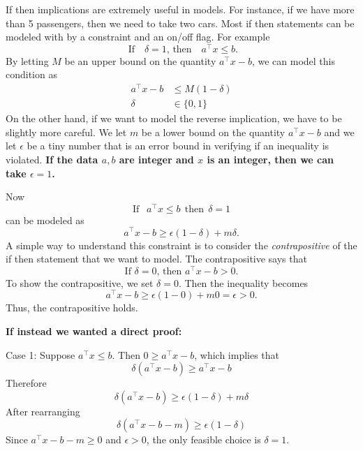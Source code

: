 \documentclass[../open-optimization/open-optimization.tex]{subfiles}
\begin{document}
If then implications are extremely useful in models.  
For instance, if we have more than 5 passengers, then we need to take two cars.   Most if then statements can be modeled with by a constraint and an on/off flag.  For example
\begin{equation}
\text{ If } \ \ \   \delta = 1 \text{, then  } \ \ \ a^\top x \leq b.
\end{equation}
By letting $M$ be an upper bound on the quantity $a^\top x - b$, we can model this condition as 
\begin{equation}
\begin{split}
a^\top x - b& \leq M(1-\delta)\\
\delta & \in \{0,1\}
\end{split}
\end{equation}
On the other hand, if we want to model the reverse implication, we have to be slightly more careful.  We let $m$ be a lower bound on the quantity $a^\top x - b$ and we let $\epsilon$ be a tiny number that is an error bound in verifying if an inequality is violated.  \textbf{If the data $a,b$ are integer and $x$ is an integer, then we can take $\epsilon = 1$.}

Now
\begin{equation}
\text{If } \ \ a^\top x \leq b  \ \ \text{then}\ \ \delta = 1
\end{equation}
can be modeled as 
\begin{equation}
a^\top x -b  \geq  \epsilon(1-\delta) + m \delta.
\end{equation}
A simple way to understand this constraint is to consider the \emph{contrapositive} of the if then statement that we want to model.  The contrapositive says that 
\begin{equation}
\text{If $\delta = 0$, then $a^\top x - b > 0$.}
\end{equation}
To show the contrapositive, we set $\delta = 0$.  Then the inequality becomes 
$$
a^\top x - b \geq \epsilon(1-0) + m0 = \epsilon > 0.
$$
Thus, the contrapositive holds.

\textbf{If instead we wanted a direct proof:}

Case 1: Suppose $a^\top x \leq b$.  Then $0 \geq a^\top x - b$, which implies that 
$$
\delta(a^\top x - b) \geq a^\top x - b
$$
Therefore
$$
\delta(a^\top x - b) \geq \epsilon(1-\delta) + m \delta
$$
After rearranging
$$
\delta(a^\top x - b - m) \geq \epsilon(1-\delta)
$$
Since $a^\top x - b - m \geq 0$ and $\epsilon > 0$, the only feasible choice is $\delta = 1$.
\end{document}

